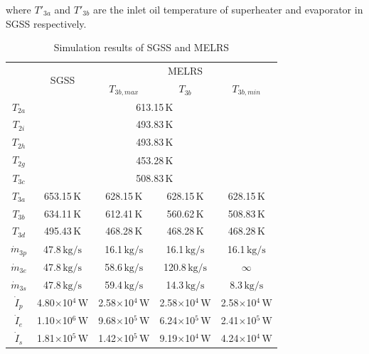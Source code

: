 where $T'_{3a}$ and $T'_{3b}$ are the inlet oil temperature of superheater and evaporator in SGSS respectively.
\begin{table}[htbp]
	\caption{Simulation results of SGSS and MELRS}
	\centering
	\begin{tabular}{ccccc}
		\toprule
		& \multirow{2}{*}{SGSS} & \multicolumn{3}{c}{MELRS}\\\cmidrule(lr){3-5}
 &  & $T_{3b,max}$ & $T_{3b}$ & $T_{3b,min}$\\
		\midrule
		$T_{2a}$ & \multicolumn{4}{c}{613.15$\,\mathrm{K}$}\\
		$T_{2i}$ & \multicolumn{4}{c}{493.83$\,\mathrm{K}$}\\
		$T_{2h}$ & \multicolumn{4}{c}{493.83$\,\mathrm{K}$}\\
		$T_{2g}$ & \multicolumn{4}{c}{453.28$\,\mathrm{K}$}\\
		$T_{3c}$ & \multicolumn{4}{c}{508.83$\,\mathrm{K}$}\\
		$T_{3a}$	&	653.15$\,\mathrm{K}$
	&	628.15$\,\mathrm{K}$	&	628.15$\,\mathrm{K}$	&	628.15$\,\mathrm{K}$\\
		$T_{3b}$	&	634.11$\,\mathrm{K}$	&	612.41$\,\mathrm{K}$	&	560.62$\,\mathrm{K}$	&	508.83$\,\mathrm{K}$\\
		$T_{3d}$	&	495.43$\,\mathrm{K}$
	&	468.28$\,\mathrm{K}$	&	468.28$\,\mathrm{K}$	&	468.28$\,\mathrm{K}$\\
		$\dot{m}_{3p}$	&	47.8$\,\mathrm{kg/s}$	&	16.1$\,\mathrm{kg/s}$	&	16.1$\,\mathrm{kg/s}$	&	16.1$\,\mathrm{kg/s}$\\
		$\dot{m}_{3e}$	&	47.8$\,\mathrm{kg/s}$	&	58.6$\,\mathrm{kg/s}$	&	120.8$\,\mathrm{kg/s}$	&	$\infty$\\
		$\dot{m}_{3s}$	&	47.8$\,\mathrm{kg/s}$	&	59.4$\,\mathrm{kg/s}$	&	14.3$\,\mathrm{kg/s}$	&	8.3$\,\mathrm{kg/s}$\\
		$\dot{I}_p$    &    4.80$\times$10$^4\,\mathrm{W}$    	&  2.58$\times$10$^4\,\mathrm{W}$  &	2.58$\times$10$^4\,\mathrm{W}$	&	2.58$\times$10$^4\,\mathrm{W}$\\
		$\dot{I}_e$    &    1.10$\times$10$^6\,\mathrm{W}$    	&  9.68$\times$10$^5\,\mathrm{W}$  &	6.24$\times$10$^5\,\mathrm{W}$	&	2.41$\times$10$^5\,\mathrm{W}$	\\
		$\dot{I}_s$    &    1.81$\times$10$^5\,\mathrm{W}$    	&  1.42$\times$10$^5\,\mathrm{W}$  &	9.19$\times$10$^4\,\mathrm{W}$	&	4.24$\times$10$^4\,\mathrm{W}$\\

\end{tabular}
\end{table}
